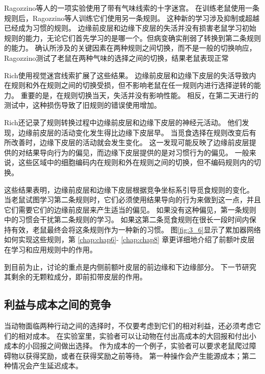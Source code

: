 Ragozzino等人\cite{ragozzino1999involvement}的一项实验使用了带有气味线索的十字迷宫。
在训练老鼠使用一条规则后，Ragozzino等人训练它们使用另一条规则。
这种新的学习涉及抑制或超越已经成为习惯的规则。
边缘前皮层和边缘下皮层的失活并没有损害老鼠学习初始规则的能力，无论它们首先学习的是哪一个。但病变确实削弱了转换到第二条规则的能力。
确认所涉及的关键因素在两种规则之间切换，而不是一般的切换响应，Ragozzino\cite{ragozzino2007contribution}测试了老鼠在两种气味的选择之间的切换，结果老鼠表现正常\par


Rich\cite{rich2007prelimbic}使用视觉迷宫线索扩展了这些结果。
边缘前皮层和边缘下皮层的失活导致内在规则和外在规则之间的切换受损，但不影响老鼠在任一规则内进行选择逆转的能力。
重要的是，在规则切换当天，失活并没有影响性能。
相反，在第二天进行的测试中，这种损伤导致了旧规则的错误使用增加。\par


Rich\cite{rich2009rat}还记录了规则转换过程中边缘前皮层和边缘下皮层的神经元活动。
他们发现，边缘前皮层的活动变化发生得比边缘下皮层早。
当觅食选择在规则改变后有所改善时，边缘下皮层的活动就会发生变化。
这一发现可能反映了边缘前皮层提供的对结果导向行为的偏见，而边缘下皮层提供的是对习惯行为的偏见。
一般来说，这些区域中的细胞编码内在规则和外在规则之间的切换，但不编码规则内的切换。\par


这些结果表明，边缘前皮层和边缘下皮层根据竞争坐标系引导觅食规则的变化。
当老鼠试图学习第二条规则时，它们必须使用结果导向的行为来做到这一点，并且它们需要它们的边缘前皮层来产生适当的偏见。
如果没有这种偏见，第一条规则中的习惯会干扰第二条规则的学习。
如果这第二条觅食规则在很长一段时间内保持有效，老鼠最终会将这条规则作为一种新的习惯。
图\ref{fig:3_6}显示了累加器网络如何实现这些规则，第 \ref{chap:chap6}- \ref{chap:chap8} 章更详细地介绍了前额叶皮层在学习和应用规则中的作用。\par


到目前为止，讨论的重点是内侧前额叶皮层的前边缘和下边缘部分。
下一节研究其剩余的无颗粒成分，即前扣带皮层的作用。\par



\subsection{利益与成本之间的竞争}

当动物面临两种行动之间的选择时，不仅要考虑到它们的相对利益，还必须考虑它们的相对成本。
在实验室里，实验者可以让动物在付出高成本的大回报和付出小成本的小回报之间做出选择。
作为成本的一个例子，实验者可以要求老鼠爬过障碍物以获得奖励\cite{salamone1997behavioral}，或者在获得奖励之前等待\cite{cardinal2001impulsive}。
第一种操作会产生能源成本；第二种情况会产生延迟成本。\par


